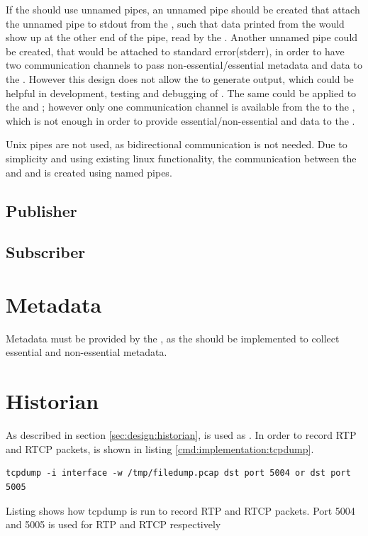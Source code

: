 If the \pub{} should use unnamed pipes, an unnamed pipe should be created that attach the unnamed pipe to stdout from the \pro{}, such that data printed from the \pro{} would show up at the other end of the pipe, read by the \pub{}. Another unnamed pipe could be created, that would be attached to standard error(stderr), in order to have two communication channels to pass non-essential/essential metadata and data to the \pub{}. However this design does not allow the \pro{} to generate output, which could be helpful in development, testing and debugging of \cons{}. The same could be applied to the \sub{} and \con{}; however only one communication channel is available from the \sub{} to the \con{}, which is not enough in order to provide essential/non-essential and data to the \con{}.

Unix pipes are not used, as bidirectional communication is not needed. Due to simplicity and using existing linux functionality, the communication between the \pubs{} \subs{} and \con{} and \pro{} is created using named pipes.


\subsection{Publisher}
\subsection{Subscriber}


\section{Metadata}
Metadata must be provided by the \pro{}, as the \pro{} should be implemented to collect essential and non-essential metadata.


\section{Historian}
As described in section \ref{sec:design:historian},  is used as \hist{}.
In order to record RTP and RTCP packets,  is shown in listing \ref{cmd:implementation:tcpdump}.
\begin{listing}[h] 
\begin{verbatim}
tcpdump -i interface -w /tmp/filedump.pcap dst port 5004 or dst port 5005 
\end{verbatim}
\caption{Listing shows how tcpdump is run to record RTP and RTCP packets. Port 5004 and 5005 is used for RTP and RTCP respectively}
\label{cmd:implementation:tcpdump}
\end{listing}



